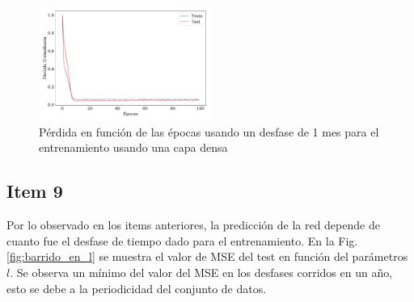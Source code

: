 \begin{figure}[H]
	\begin{small}
		\begin{center}
			\includegraphics[width=0.5\textwidth]{prediccion_l-1_dense_loss.pdf}
		\end{center}
		\caption{Pérdida en función de las épocas usando un desfase de 1 mes para el entrenamiento usando una capa densa}
		\label{fig:l-1-Densa}
	\end{small}
\end{figure}


\subsection*{Item 9}

Por lo observado en los items anteriores, la predicción de la red depende de cuanto fue el desfase de tiempo dado para el entrenamiento. En la Fig.\,\ref{fig:barrido_en_l} se muestra el valor de MSE del test en función del parámetros $l$. Se observa un mínimo del valor del MSE en los desfases corridos en un año, esto se debe a la periodicidad del conjunto de datos.

